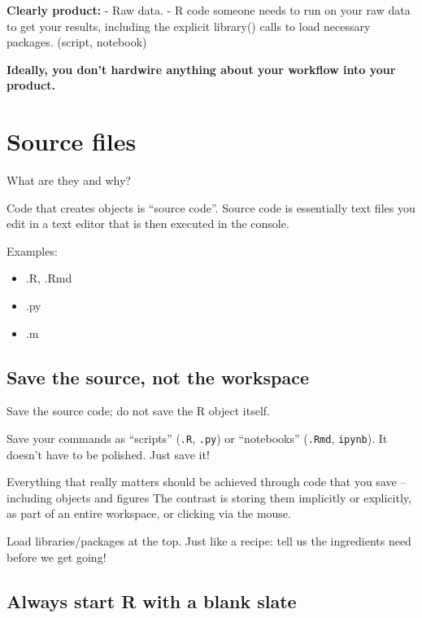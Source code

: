 \documentclass[
  letterpaper,
  DIV=11,
  numbers=noendperiod]{scrreprt}
\providecommand{\tightlist}{%
  \setlength{\itemsep}{0pt}\setlength{\parskip}{0pt}}
\begin{document}
\textbf{Clearly product:} - Raw data. - R code someone needs to run on
your raw data to get your results, including the explicit library()
calls to load necessary packages. (script, notebook)

\textbf{Ideally, you don't hardwire anything about your workflow into
your product.}

\hypertarget{source-files}{%
\section{Source files}\label{source-files}}

What are they and why?

Code that creates objects is ``source code''. Source code is essentially
text files you edit in a text editor that is then executed in the
console.

Examples:

\begin{itemize}
\tightlist
\item
  .R, .Rmd
\item
  .py
\item
  .m
\end{itemize}

\hypertarget{save-the-source-not-the-workspace}{%
\subsection{Save the source, not the
workspace}\label{save-the-source-not-the-workspace}}

Save the source code; do not save the R object itself.

Save your commands as ``scripts'' (\texttt{.R}, \texttt{.py}) or
``notebooks'' (\texttt{.Rmd}, \texttt{ipynb}). It doesn't have to be
polished. Just save it!

Everything that really matters should be achieved through code that you
save -- including objects and figures The contrast is storing them
implicitly or explicitly, as part of an entire workspace, or clicking
via the mouse.

Load libraries/packages at the top. Just like a recipe: tell us the
ingredients need before we get going!

\hypertarget{always-start-r-with-a-blank-slate}{%
\subsection{Always start R with a blank
slate}\label{always-start-r-with-a-blank-slate}}
\end{document}
